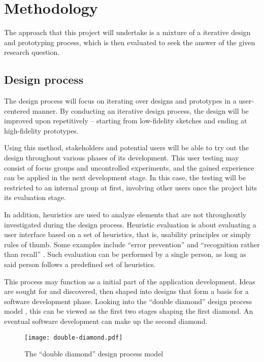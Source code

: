 \chapter{Methodology}
\label{ch:methodology}

The approach that this project will undertake is a mixture of a iterative design and prototyping process, which is then evaluated to seek the answer of the given research question.

\section{Design process}
\label{sec:designprocess}

The design process will focus on iterating over designs and prototypes in a user-centered manner. By conducting an iterative design process, the design will be improved upon repetitively -- starting from low-fidelity sketches and ending at high-fidelity prototypes.

Using this method, stakeholders and potential users will be able to try out the design throughout various phases of its development. This user testing may consist of focus groups and uncontrolled experiments, and the gained experience can be applied in the next development stage. In this case, the testing will be restricted to an internal group at first, involving other users once the project hits its evaluation stage.

In addition, heuristics are used to analyze elements that are not throughoutly investigated during the design process. Heuristic evaluation is about evaluating a user interface based on a set of heuristics, that is, usability principles or simply rules of thumb. Some examples include \enquote{error prevention} and \enquote{recognition rather than recall} \parencite{nilsen1994}. Such evaluation can be performed by a single person, as long as said person follows a predefined set of heuristics.

This process may function as a initial part of the application development. Ideas are sought for and discovered, then shaped into designs that form a basis for a software development phase. Looking into the \enquote{double diamond} design process model \parencite{designcouncil2007}, this can be viewed as the first two stages shaping the first diamond. An eventual software development can make up the second diamond.

\begin{figure}
    \centering
    \texttt{[image: double-diamond.pdf]}
    \caption{The \enquote{double diamond} design process model}
    \label{fig:doublediamond}
\end{figure}

